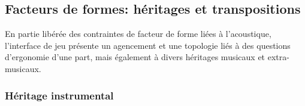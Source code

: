 
\subsection{Facteurs de formes: héritages et transpositions}
\label{sec:interfaces:heritages}

\noindent En partie libérée des contraintes de facteur de forme liées à l'acoustique, l'interface de jeu présente un agencement et une topologie liés à des questions d'ergonomie d'une part, mais également à divers héritages musicaux et extra-musicaux.

\subsubsection{Héritage instrumental}
\label{sec:interfaces:heritages:instrument}
